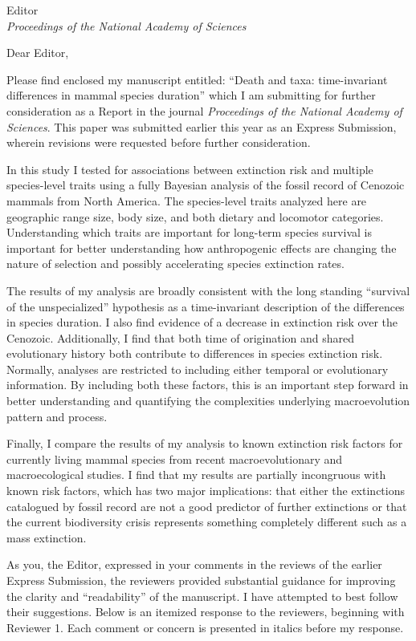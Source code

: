 \documentclass{letter}
\begin{document}
\begin{letter}{Editor \\ \textit{Proceedings of the National Academy of Sciences}}
  \opening{Dear Editor,}

  Please find enclosed my manuscript entitled: ``Death and taxa: time-invariant differences in mammal species duration'' which I am submitting for further consideration as a Report in the journal \textit{Proceedings of the National Academy of Sciences}. This paper was submitted earlier this year as an Express Submission, wherein revisions were requested before further consideration.

  In this study I tested for associations between extinction risk and multiple species-level traits using a fully Bayesian analysis of the fossil record of Cenozoic mammals from North America. The species-level traits analyzed here are geographic range size, body size, and both dietary and locomotor categories. Understanding which traits are important for long-term species survival is important for better understanding how anthropogenic effects are changing the nature of selection and possibly accelerating species extinction rates.

  The results of my analysis are broadly consistent with the long standing ``survival of the unspecialized'' hypothesis as a time-invariant description of the differences in species duration. I also find evidence of a decrease in extinction risk over the Cenozoic. Additionally, I find that both time of origination and shared evolutionary history both contribute to differences in species extinction risk. Normally, analyses are restricted to including either temporal or evolutionary information. By including both these factors, this is an important step forward in better understanding and quantifying the complexities underlying macroevolution pattern and process.

  Finally, I compare the results of my analysis to known extinction risk factors for currently living mammal species from recent macroevolutionary and macroecological studies. I find that my results are partially incongruous with known risk factors, which has two major implications: that either the extinctions catalogued by fossil record are not a good predictor of further extinctions or that the current biodiversity crisis represents something completely different such as a mass extinction.

  As you, the Editor, expressed in your comments in the reviews of the earlier Express Submission, the reviewers provided substantial guidance for improving the clarity and ``readability'' of the manuscript. I have attempted to best follow their suggestions. Below is an itemized response to the reviewers, beginning with Reviewer 1. Each comment or concern is presented in italics before my response.



\end{letter}
\end{document}
